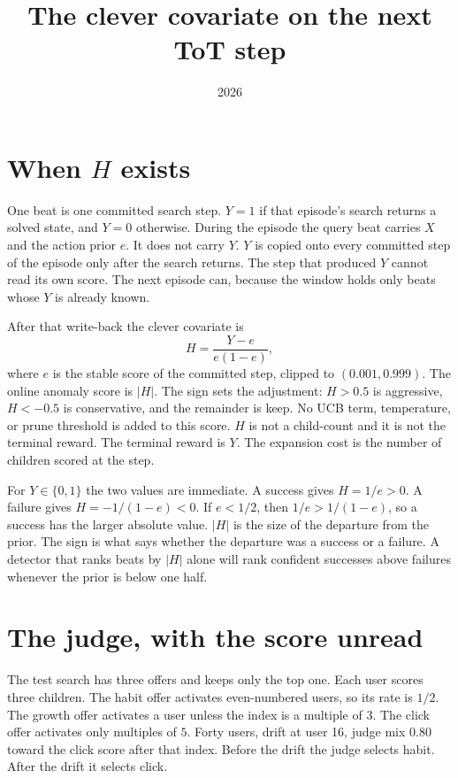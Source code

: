 \documentclass[11pt,a4paper]{article}
\title{The clever covariate on the next ToT step}
\author{}
\date{2026}
\begin{document}
\maketitle

\section{When \(H\) exists}
One beat is one committed search step.
\(Y=1\) if that episode's search returns a solved state, and \(Y=0\) otherwise.
During the episode the query beat carries \(X\) and the action prior \(e\).
It does not carry \(Y\).
\(Y\) is copied onto every committed step of the episode only after the search returns.
The step that produced \(Y\) cannot read its own score.
The next episode can, because the window holds only beats whose \(Y\) is already known.

After that write-back the clever covariate is
\[
H=\frac{Y-e}{e(1-e)},
\]
where \(e\) is the stable score of the committed step, clipped to \((0.001,0.999)\).
The online anomaly score is \(|H|\).
The sign sets the adjustment: \(H>0.5\) is aggressive, \(H<-0.5\) is conservative, and the remainder is keep.
No UCB term, temperature, or prune threshold is added to this score.
\(H\) is not a child-count and it is not the terminal reward.
The terminal reward is \(Y\).
The expansion cost is the number of children scored at the step.

For \(Y\in\{0,1\}\) the two values are immediate.
A success gives \(H=1/e>0\).
A failure gives \(H=-1/(1-e)<0\).
If \(e<1/2\), then \(1/e>1/(1-e)\), so a success has the larger absolute value.
\(|H|\) is the size of the departure from the prior.
The sign is what says whether the departure was a success or a failure.
A detector that ranks beats by \(|H|\) alone will rank confident successes above failures whenever the prior is below one half.

\section{The judge, with the score unread}
The test search has three offers and keeps only the top one.
Each user scores three children.
The habit offer activates even-numbered users, so its rate is \(1/2\).
The growth offer activates a user unless the index is a multiple of \(3\).
The click offer activates only multiples of \(5\).
Forty users, drift at user 16, judge mix \(0.80\) toward the click score after that index.
Before the drift the judge selects habit.
After the drift it selects click.
\end{document}
